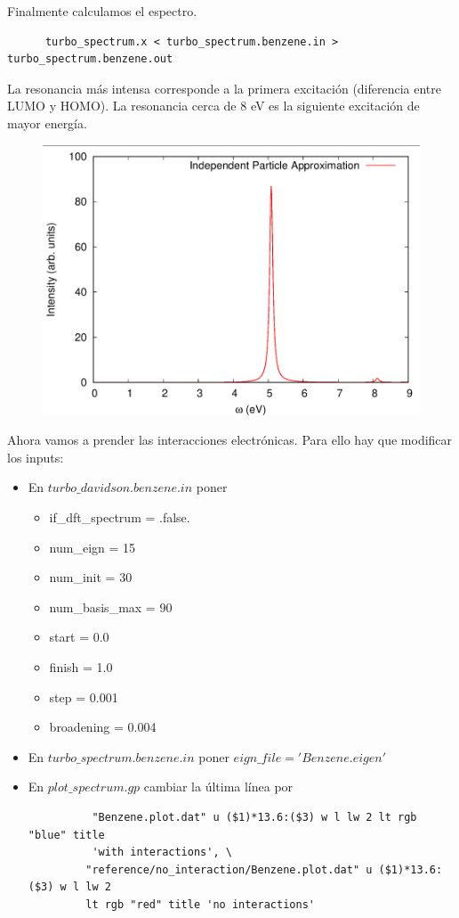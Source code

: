   Finalmente calculamos el espectro.
    \begin{verbatim}
      turbo_spectrum.x < turbo_spectrum.benzene.in > turbo_spectrum.benzene.out
    \end{verbatim}

  La resonancia más intensa corresponde a la primera excitación (diferencia entre LUMO y HOMO). La resonancia cerca de 8 eV es la siguiente excitación de mayor energía.
    \begin{figure}[H]
        \centering
        \includegraphics[scale = 0.4]{figs/D6/Benceno_IPA.png}
    \end{figure}

  Ahora vamos a prender las interacciones electrónicas. Para ello hay que modificar los inputs:
    \begin{itemize}
      \item En $turbo\_davidson.benzene.in$ poner
        \begin{itemize}
          \item if\_dft\_spectrum = .false.
          \item num\_eign = 15
          \item num\_init = 30
          \item num\_basis\_max = 90
          \item start = 0.0
          \item finish = 1.0
          \item step = 0.001
          \item broadening = 0.004
        \end{itemize}
      \item En $turbo\_spectrum.benzene.in$ poner $eign\_file = 'Benzene.eigen'$
      \item En $plot\_spectrum.gp$ cambiar la última línea por
        \begin{verbatim}
          "Benzene.plot.dat" u ($1)*13.6:($3) w l lw 2 lt rgb "blue" title
          'with interactions', \
         "reference/no_interaction/Benzene.plot.dat" u ($1)*13.6:($3) w l lw 2
         lt rgb "red" title 'no interactions'
        \end{verbatim}
    \end{itemize}

